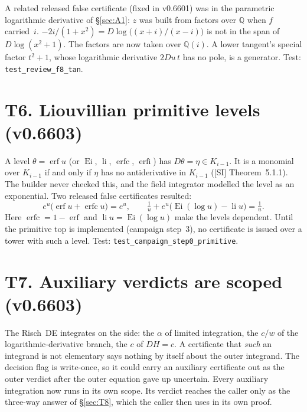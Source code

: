 \documentclass[11pt]{article}
\theoremstyle{definition}
\theoremstyle{remark}
\newcommand{\Q}{\mathbb{Q}}
\newcommand{\code}[1]{\texttt{#1}}
\begin{document}
A related released false certificate (fixed in v0.6601) was in the parametric
logarithmic derivative of \S\ref{sec:A1}: $z$ was built from factors over $\Q$ when $f$
carried~$i$. $-2i/(1+x^2)=D\log\bigl((x+i)/(x-i)\bigr)$ is not in the span of
$D\log(x^2+1)$. The factors are now taken over $\Q(i)$. A lower tangent's special
factor $t^2+1$, whose logarithmic derivative $2Du\,t$ has no pole, is a generator.
Test: \code{test\_review\_f8\_tan}.

\section*{T6. Liouvillian primitive levels (v0.6603)}

A level $\theta=\operatorname{erf}u$ (or $\operatorname{Ei}$, $\operatorname{li}$,
$\operatorname{erfc}$, $\operatorname{erfi}$) has $D\theta=\eta\in K_{i-1}$. It is a
monomial over $K_{i-1}$ if and only if $\eta$ has no antiderivative in $K_{i-1}$
([SI] Theorem~5.1.1). The builder never checked this, and the field integrator modelled
the level as an exponential. Two released false certificates resulted:
\[ e^u\bigl(\operatorname{erf}u+\operatorname{erfc}u\bigr)=e^u,\qquad
   \tfrac1u+e^u\bigl(\operatorname{Ei}(\log u)-\operatorname{li}u\bigr)=\tfrac1u. \]
Here $\operatorname{erfc}=1-\operatorname{erf}$ and $\operatorname{li}u=\operatorname{Ei}(\log u)$
make the levels dependent. Until the primitive top is implemented (campaign step~3), no
certificate is issued over a tower with such a level. Test: \code{test\_campaign\_step0\_primitive}.

\section*{T7. Auxiliary verdicts are scoped (v0.6603)}

The Risch~DE integrates on the side: the $\alpha$ of limited integration, the $c/w$ of
the logarithmic-derivative branch, the $c$ of $DH=c$. A certificate that \emph{such} an
integrand is not elementary says nothing by itself about the outer integrand. The
decision flag is write-once, so it could carry an auxiliary certificate out as the
outer verdict after the outer equation gave up uncertain. Every auxiliary integration
now runs in its own scope. Its verdict reaches the caller only as the three-way answer
of \S\ref{sec:T8}, which the caller then uses in its own proof.
\end{document}

